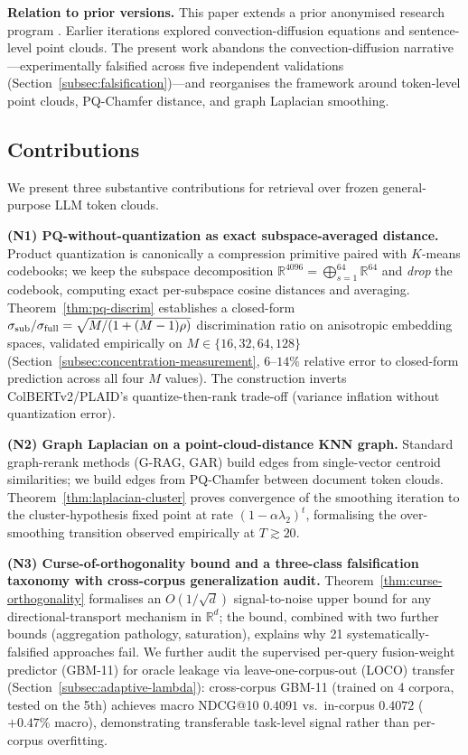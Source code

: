 \documentclass[review,1p]{elsarticle}
\newcommand{\R}{\mathbb{R}}
\begin{document}
\textbf{Relation to prior versions.} This paper extends a prior anonymised research program \citep{anonprior2026a,anonprior2026b}. Earlier iterations explored convection-diffusion equations and sentence-level point clouds. The present work abandons the convection-diffusion narrative---experimentally falsified across five independent validations (Section~\ref{subsec:falsification})---and reorganises the framework around token-level point clouds, PQ-Chamfer distance, and graph Laplacian smoothing.

\subsection{Contributions}
\label{subsec:contributions}

We present three substantive contributions for retrieval over frozen general-purpose LLM token clouds.

\textbf{(N1) PQ-without-quantization as exact subspace-averaged distance.} Product quantization is canonically a compression primitive paired with $K$-means codebooks; we keep the subspace decomposition $\R^{4096} = \bigoplus_{s=1}^{64} \R^{64}$ and \emph{drop} the codebook, computing exact per-subspace cosine distances and averaging. Theorem~\ref{thm:pq-discrim} establishes a closed-form $\sigma_{\rm sub}/\sigma_{\rm full} = \sqrt{M/(1+(M-1)\rho)}$ discrimination ratio on anisotropic embedding spaces, validated empirically on $M \in \{16, 32, 64, 128\}$ (Section~\ref{subsec:concentration-measurement}, $6$--$14\%$ relative error to closed-form prediction across all four $M$ values). The construction inverts ColBERTv2/PLAID's quantize-then-rank trade-off (variance inflation without quantization error).

\textbf{(N2) Graph Laplacian on a point-cloud-distance KNN graph.} Standard graph-rerank methods (G-RAG, GAR) build edges from single-vector centroid similarities; we build edges from PQ-Chamfer between document token clouds. Theorem~\ref{thm:laplacian-cluster} proves convergence of the smoothing iteration to the cluster-hypothesis fixed point at rate $(1-\alpha\lambda_2)^t$, formalising the over-smoothing transition observed empirically at $T \gtrsim 20$.

\textbf{(N3) Curse-of-orthogonality bound and a three-class falsification taxonomy with cross-corpus generalization audit.} Theorem~\ref{thm:curse-orthogonality} formalises an $O(1/\sqrt{d})$ signal-to-noise upper bound for any directional-transport mechanism in $\R^d$; the bound, combined with two further bounds (aggregation pathology, saturation), explains why 21 systematically-falsified approaches fail. We further audit the supervised per-query fusion-weight predictor (GBM-11) for oracle leakage via leave-one-corpus-out (LOCO) transfer (Section~\ref{subsec:adaptive-lambda}): cross-corpus GBM-11 (trained on 4 corpora, tested on the 5th) achieves macro NDCG@10 $0.4091$ vs.\ in-corpus $0.4072$ ($+0.47\%$ macro), demonstrating transferable task-level signal rather than per-corpus overfitting.
\end{document}

